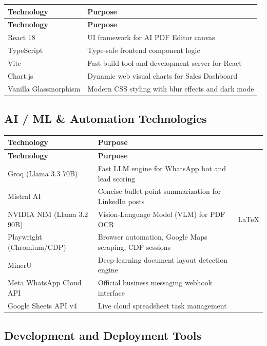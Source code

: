 \documentclass[12pt,a4paper]{report}
\begin{document}
\begin{longtable}{|p{4cm}|p{9cm}|}
\hline
\textbf{Technology} & \textbf{Purpose} \\
\hline
\endfirsthead
\hline
\textbf{Technology} & \textbf{Purpose} \\
\hline
\endhead
React 18 & UI framework for AI PDF Editor canvas \\
\hline
TypeScript & Type-safe frontend component logic \\
\hline
Vite & Fast build tool and development server for React \\
\hline
Chart.js & Dynamic web visual charts for Sales Dashboard \\
\hline
Vanilla Glassmorphism & Modern CSS styling with blur effects and dark mode \\
\hline
\end{longtable}

\subsection{AI / ML & Automation Technologies}

\begin{longtable}{|p{4cm}|p{9cm}|}
\hline
\textbf{Technology} & \textbf{Purpose} \\
\hline
\endfirsthead
\hline
\textbf{Technology} & \textbf{Purpose} \\
\hline
\endhead
Groq (Llama 3.3 70B) & Fast LLM engine for WhatsApp bot and lead scoring \\
\hline
Mistral AI & Concise bullet-point summarization for LinkedIn posts \\
\hline
NVIDIA NIM (Llama 3.2 90B) & Vision-Language Model (VLM) for PDF OCR & LaTeX \\
\hline
Playwright (Chromium/CDP) & Browser automation, Google Maps scraping, CDP sessions \\
\hline
MinerU & Deep-learning document layout detection engine \\
\hline
Meta WhatsApp Cloud API & Official business messaging webhook interface \\
\hline
Google Sheets API v4 & Live cloud spreadsheet task management \\
\hline
\end{longtable}

\subsection{Development and Deployment Tools}
\end{document}
